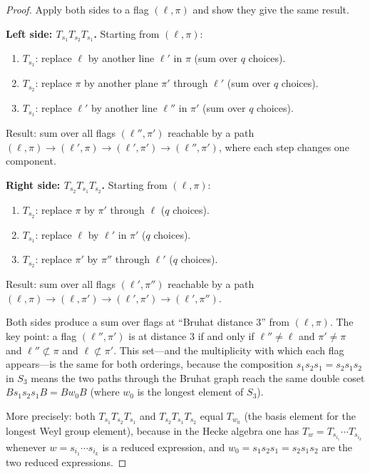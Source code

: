 \documentclass[12pt,a4paper]{article}
\theoremstyle{definition}
\theoremstyle{remark}
\begin{document}
\begin{proof}
Apply both sides to a flag $(\ell, \pi)$ and show they give the same
result.

\medskip\noindent\textbf{Left side: $T_{s_1} T_{s_2} T_{s_1}$.}
Starting from $(\ell, \pi)$:
\begin{enumerate}
\item $T_{s_1}$: replace $\ell$ by another line $\ell'$ in $\pi$
  (sum over $q$ choices).
\item $T_{s_2}$: replace $\pi$ by another plane $\pi'$ through
  $\ell'$ (sum over $q$ choices).
\item $T_{s_1}$: replace $\ell'$ by another line $\ell''$ in $\pi'$
  (sum over $q$ choices).
\end{enumerate}
Result: sum over all flags $(\ell'', \pi')$ reachable by a path
$(\ell, \pi) \to (\ell', \pi) \to (\ell', \pi') \to (\ell'', \pi')$,
where each step changes one component.

\medskip\noindent\textbf{Right side: $T_{s_2} T_{s_1} T_{s_2}$.}
Starting from $(\ell, \pi)$:
\begin{enumerate}
\item $T_{s_2}$: replace $\pi$ by $\pi'$ through $\ell$ ($q$ choices).
\item $T_{s_1}$: replace $\ell$ by $\ell'$ in $\pi'$ ($q$ choices).
\item $T_{s_2}$: replace $\pi'$ by $\pi''$ through $\ell'$ ($q$ choices).
\end{enumerate}
Result: sum over all flags $(\ell', \pi'')$ reachable by a path
$(\ell, \pi) \to (\ell, \pi') \to (\ell', \pi') \to (\ell', \pi'')$.

\medskip\noindent Both sides produce a sum over flags at
``Bruhat distance 3'' from $(\ell, \pi)$. The key point: a flag
$(\ell'', \pi')$ is at distance 3 if and only if $\ell'' \neq \ell$
and $\pi' \neq \pi$ and $\ell'' \not\subset \pi$ and
$\ell \not\subset \pi'$. This set---and the multiplicity with which
each flag appears---is the same for both orderings, because the
composition $s_1 s_2 s_1 = s_2 s_1 s_2$ in $S_3$ means the two
paths through the Bruhat graph reach the same double coset $Bs_1 s_2
s_1 B = B w_0 B$ (where $w_0$ is the longest element of $S_3$).

More precisely: both $T_{s_1}T_{s_2}T_{s_1}$ and $T_{s_2}T_{s_1}T_{s_2}$
equal $T_{w_0}$ (the basis element for the longest Weyl group element),
because in the Hecke algebra one has $T_{w} = T_{s_{i_1}} \cdots
T_{s_{i_k}}$ whenever $w = s_{i_1} \cdots s_{i_k}$ is a reduced
expression, and $w_0 = s_1 s_2 s_1 = s_2 s_1 s_2$ are the two
reduced expressions.
\end{proof}
\end{document}
